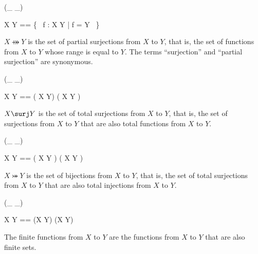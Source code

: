 \documentclass[draft,a4paper,10pt,wd]{isov2}
\begin{document}
\begin{zed}
 \rightassoc (\_ \psurj \_)
\end{zed}

\begin{zed}
X \psurj Y == \{~ f : X \pfun Y | \ran f = Y ~\}
\end{zed}

$X \psurj Y$ is the set of partial surjections from $X$ to $Y$,
that is, the set of functions from $X$ to $Y$
whose range is equal to $Y$.
The terms ``surjection'' and ``partial surjection'' are synonymous.


\begin{zed}
 \rightassoc (\_ \surj \_)
\end{zed}

\begin{zed}
X \surj Y == ( X \psurj Y) \cap ( X \fun Y )
\end{zed}

$X \surj Y$ is the set of total surjections from $X$ to $Y$,
that is, the set of surjections from $X$ to $Y$
that are also total functions from $X$ to $Y$.


\begin{zed}
 \rightassoc (\_ \bij \_)
\end{zed}

\begin{zed}
X \bij Y == ( X \surj Y ) \cap ( X \inj Y )
\end{zed}

$X \bij Y$ is the set of bijections from $X$ to $Y$,
that is, the set of total surjections from $X$ to $Y$
that are also total injections from $X$ to $Y$.


\begin{zed}
 \rightassoc (\_ \ffun \_)
\end{zed}

\begin{zed}
X \ffun Y == (X \pfun Y) \cap \finset (X \cross Y)
\end{zed}

The finite functions from $X$ to $Y$ are the functions from $X$ to $Y$
that are also finite sets.

\end{document}
